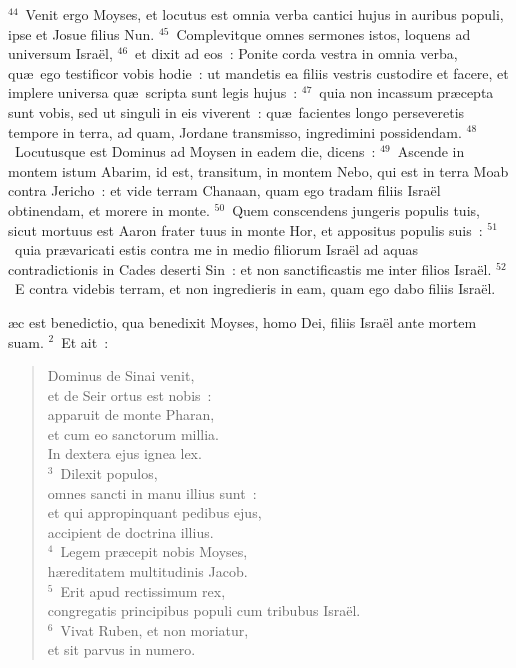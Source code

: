 ${}^{44}$~Venit ergo Moyses, et locutus est omnia verba cantici hujus in auribus populi, ipse et Josue filius Nun.
${}^{45}$~Complevitque omnes sermones istos, loquens ad universum Isra\"el,
${}^{46}$~et dixit ad eos~: Ponite corda vestra in omnia verba, qu\ae\ ego testificor vobis hodie~: ut mandetis ea filiis vestris custodire et facere, et implere universa qu\ae\ scripta sunt legis hujus~:
${}^{47}$~quia non incassum pr\ae cepta sunt vobis, sed ut singuli in eis viverent~: qu\ae\ facientes longo perseveretis tempore in terra, ad quam, Jordane transmisso, ingredimini possidendam.
${}^{48}$~Locutusque est Dominus ad Moysen in eadem die, dicens~:
${}^{49}$~Ascende in montem istum Abarim, id est, transitum, in montem Nebo, qui est in terra Moab contra Jericho~: et vide terram Chanaan, quam ego tradam filiis Isra\"el obtinendam, et morere in monte.
${}^{50}$~Quem conscendens jungeris populis tuis, sicut mortuus est Aaron frater tuus in monte Hor, et appositus populis suis~:
${}^{51}$~quia pr\ae varicati estis contra me in medio filiorum Isra\"el ad aquas contradictionis in Cades deserti Sin~: et non sanctificastis me inter filios Isra\"el.
${}^{52}$~E contra videbis terram, et non ingredieris in eam, quam ego dabo filiis Isra\"el.

\bchapter
{}\ae c est benedictio, qua benedixit Moyses, homo Dei, filiis Isra\"el ante mortem suam.
${}^{2}$~Et ait~: \begin{flushleft}\begin{verse}Dominus de Sinai venit,\\ et de Seir ortus est nobis~:\\ apparuit de monte Pharan,\\ et cum eo sanctorum millia.\\ In dextera ejus ignea lex.\\
${}^{3}$~Dilexit populos,\\ omnes sancti in manu illius sunt~:\\ et qui appropinquant pedibus ejus,\\ accipient de doctrina illius.\\
${}^{4}$~Legem pr\ae cepit nobis Moyses,\\ h\ae reditatem multitudinis Jacob.\\
${}^{5}$~Erit apud rectissimum rex,\\ congregatis principibus populi cum tribubus Isra\"el.\\
${}^{6}$~Vivat Ruben, et non moriatur,\\ et sit parvus in numero.\end{verse}\end{flushleft}


